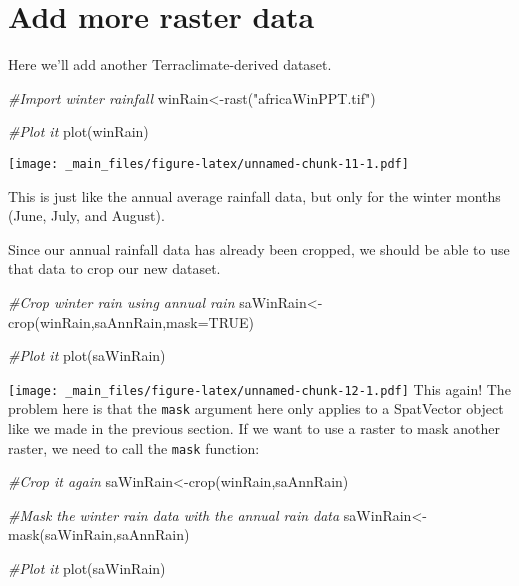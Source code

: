 \documentclass[
]{book}
\newenvironment{Shaded}{\begin{snugshade}}{\end{snugshade}}
\newcommand{\AttributeTok}[1]{\textcolor[rgb]{0.77,0.63,0.00}{#1}}
\newcommand{\CommentTok}[1]{\textcolor[rgb]{0.56,0.35,0.01}{\textit{#1}}}
\newcommand{\ConstantTok}[1]{\textcolor[rgb]{0.00,0.00,0.00}{#1}}
\newcommand{\FunctionTok}[1]{\textcolor[rgb]{0.00,0.00,0.00}{#1}}
\newcommand{\NormalTok}[1]{#1}
\newcommand{\OtherTok}[1]{\textcolor[rgb]{0.56,0.35,0.01}{#1}}
\newcommand{\StringTok}[1]{\textcolor[rgb]{0.31,0.60,0.02}{#1}}
\begin{document}
\hypertarget{add-more-raster-data}{%
\section{Add more raster data}\label{add-more-raster-data}}

Here we'll add another Terraclimate-derived dataset.

\begin{Shaded}
\begin{Highlighting}[]
\CommentTok{\#Import winter rainfall }
\NormalTok{winRain}\OtherTok{\textless{}{-}}\FunctionTok{rast}\NormalTok{(}\StringTok{"africaWinPPT.tif"}\NormalTok{)}

\CommentTok{\#Plot it}
\FunctionTok{plot}\NormalTok{(winRain)}
\end{Highlighting}
\end{Shaded}

\texttt{[image: \_main\_files/figure-latex/unnamed-chunk-11-1.pdf]}

This is just like the annual average rainfall data, but only for the winter months (June, July, and August).

Since our annual rainfall data has already been cropped, we should be able to use that data to crop our new dataset.

\begin{Shaded}
\begin{Highlighting}[]
\CommentTok{\#Crop winter rain using annual rain}
\NormalTok{saWinRain}\OtherTok{\textless{}{-}}\FunctionTok{crop}\NormalTok{(winRain,saAnnRain,}\AttributeTok{mask=}\ConstantTok{TRUE}\NormalTok{)}

\CommentTok{\#Plot it}
\FunctionTok{plot}\NormalTok{(saWinRain)}
\end{Highlighting}
\end{Shaded}

\texttt{[image: \_main\_files/figure-latex/unnamed-chunk-12-1.pdf]}
This again! The problem here is that the \texttt{mask} argument here only applies to a SpatVector object like we made in the previous section. If we want to use a raster to mask another raster, we need to call the \texttt{mask} function:

\begin{Shaded}
\begin{Highlighting}[]
\CommentTok{\#Crop it again}
\NormalTok{saWinRain}\OtherTok{\textless{}{-}}\FunctionTok{crop}\NormalTok{(winRain,saAnnRain)}

\CommentTok{\#Mask the winter rain data with the annual rain data}
\NormalTok{saWinRain}\OtherTok{\textless{}{-}}\FunctionTok{mask}\NormalTok{(saWinRain,saAnnRain)}

\CommentTok{\#Plot it}
\FunctionTok{plot}\NormalTok{(saWinRain)}
\end{Highlighting}
\end{Shaded}
\end{document}
